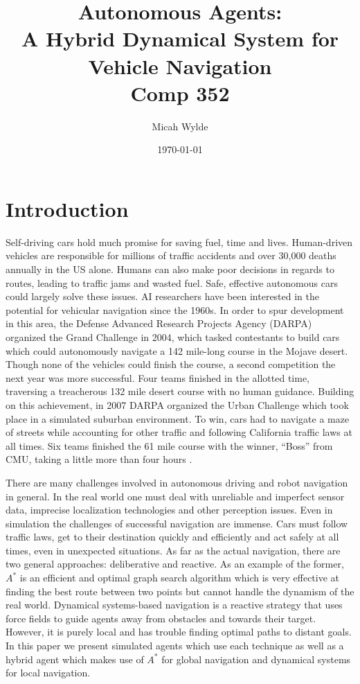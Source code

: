 \documentclass{article}
\author{Micah Wylde}
\date{\today}
\title{Autonomous Agents:\\
A Hybrid Dynamical System for Vehicle Navigation\\
Comp 352}
\begin{document}
\maketitle

\section{Introduction}
Self-driving cars hold much promise for saving fuel, time and
lives. Human-driven vehicles are responsible for millions of traffic accidents
and over 30,000 deaths annually in the US alone. Humans can also make poor
decisions in regards to routes, leading to traffic jams and wasted fuel. Safe,
effective autonomous cars could largely solve these issues. AI researchers have
been interested in the potential for vehicular navigation since the 1960s. In
order to spur development in this area, the Defense Advanced Research Projects
Agency (DARPA) organized the Grand Challenge in 2004, which tasked contestants
to build cars which could autonomously navigate a 142 mile-long course in the
Mojave desert. Though none of the vehicles could finish the course, a second
competition the next year was more successful. Four teams finished in the
allotted time, traversing a treacherous 132 mile desert course with no human
guidance. Building on this achievement, in 2007 DARPA organized the Urban
Challenge which took place in a simulated suburban environment. To win, cars had
to navigate a maze of streets while accounting for other traffic and following
California traffic laws at all times. Six teams finished the 61 mile course with
the winner, ``Boss'' from CMU, taking a little more than four hours
\cite{robotic_cars}.

There are many challenges involved in autonomous driving and robot navigation in
general. In the real world one must deal with unreliable and imperfect sensor
data, imprecise localization technologies and other perception issues. Even in
simulation the challenges of successful navigation are immense. Cars must follow
traffic laws, get to their destination quickly and efficiently and act safely at
all times, even in unexpected situations. As far as the actual navigation, there
are two general approaches: deliberative and reactive. As an example of the
former, $A^*$ is an efficient and optimal graph search algorithm which is very
effective at finding the best route between two points but cannot handle the
dynamism of the real world. Dynamical systems-based navigation is a reactive
strategy that uses force fields to guide agents away from obstacles and towards
their target. However, it is purely local and has trouble finding optimal paths
to distant goals. In this paper we present simulated agents which use each
technique as well as a hybrid agent which makes use of $A^*$ for global
navigation and dynamical systems for local navigation.
\end{document}
